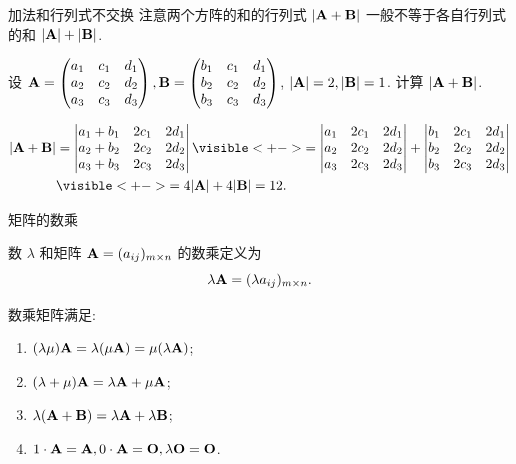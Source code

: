 \begin{frame}{加法和行列式不交换}
	\onslide<+->
	注意两个方阵的和的行列式 $|{\mathbf{A}}+{\mathbf{B}}|$ 一般不等于各自行列式的和 $|{\mathbf{A}}|+|{\mathbf{B}}|$.
	\onslide<+->
	\begin{example}
		设 ${\mathbf{A}}=\begin{pmatrix}
			a_1&c_1&d_1\\
			a_2&c_2&d_2\\
			a_3&c_3&d_3
		\end{pmatrix},{\mathbf{B}}=\begin{pmatrix}
			b_1&c_1&d_1\\
			b_2&c_2&d_2\\
			b_3&c_3&d_3
		\end{pmatrix}$, $|{\mathbf{A}}|=2,|{\mathbf{B}}|=1$.
		计算 $|{\mathbf{A}}+{\mathbf{B}}|$.
	\end{example}
	\onslide<+->
	\begin{solution}
		\begin{align*}
			|\bfA+\bfB|&=\detm{
				a_1+b_1&2c_1&2d_1\\
				a_2+b_2&2c_2&2d_2\\
				a_3+b_3&2c_3&2d_3
			}
			\visible<+->{=\detm{
				a_1&2c_1&2d_1\\
				a_2&2c_2&2d_2\\
				a_3&2c_3&2d_3
			}+\detm{
				b_1&2c_1&2d_1\\
				b_2&2c_2&2d_2\\
				b_3&2c_3&2d_3
			}}\\
			&\visible<+->{=4|\bfA|+4|\bfB|=12.}
		\end{align*}
	\end{solution}
\end{frame}


\begin{frame}{矩阵的数乘}
	\onslide<+->
	\begin{definition}
		数 $\lambda$ 和矩阵 ${\mathbf{A}}=(a_{ij})_{m\times n}$ 的数乘定义为
		\[\lambda{\mathbf{A}}=(\lambda a_{ij})_{m\times n}.\]
	\end{definition}
	\onslide<+->
	数乘矩阵满足:
	\begin{enumerate}
		\item $(\lambda \mu){\mathbf{A}}=\lambda(\mu{\mathbf{A}})=\mu(\lambda{\mathbf{A}})$;
		\item $(\lambda+\mu){\mathbf{A}}=\lambda{\mathbf{A}}+\mu{\mathbf{A}}$;
		\item $\lambda({\mathbf{A}}+{\mathbf{B}})=\lambda{\mathbf{A}}+\lambda{\mathbf{B}}$;
		\item $1\cdot {\mathbf{A}}={\mathbf{A}}, 0\cdot{\mathbf{A}}={\mathbf{O}},\lambda{\mathbf{O}}={\mathbf{O}}$.
	\end{enumerate}
\end{frame}


